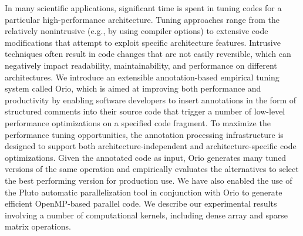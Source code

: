 In many scientific applications, significant time is spent in tuning
codes for a particular high-performance architecture. Tuning
approaches range from the relatively nonintrusive (e.g., by using
compiler options) to extensive code modifications that attempt to
exploit specific architecture features. Intrusive techniques often
result in code changes that are not easily reversible, which can
negatively impact readability, maintainability, and performance on
different architectures. We introduce an extensible annotation-based
empirical tuning system called Orio, which is aimed at improving both
performance and productivity by enabling software developers to insert
annotations in the form of structured comments into their source code
that trigger a number of low-level performance optimizations on a
specified code fragment.  To maximize the performance tuning
opportunities, the annotation processing infrastructure is designed to
support both architecture-independent and architecture-specific code
optimizations. Given the annotated code as input, Orio generates many
tuned versions of the same operation and empirically evaluates the
alternatives to select the best performing version for production
use. We have also enabled the use of the Pluto automatic
parallelization tool in conjunction with Orio to generate efficient
OpenMP-based parallel code. We describe our experimental results
involving a number of computational kernels, including dense array and
sparse matrix operations.
